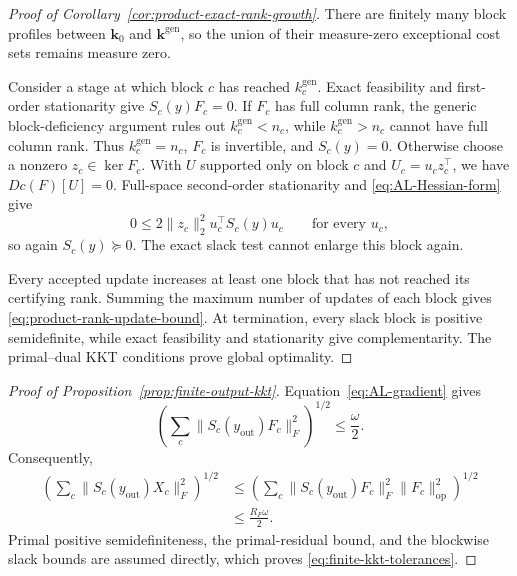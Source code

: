 \documentclass[11pt]{article}
\theoremstyle{definition}
\theoremstyle{remark}
\begin{document}
\begin{proof}[Proof of Corollary~\ref{cor:product-exact-rank-growth}]
There are finitely many block profiles between
$\mathbf k_0$ and $\mathbf k^{\mathrm{gen}}$, so the union of their
measure-zero exceptional cost sets remains measure zero.

Consider a stage at which block $c$ has reached
$k_c^{\mathrm{gen}}$.  Exact feasibility and first-order stationarity give
$S_c(y)F_c=0$.  If $F_c$ has full column rank, the generic block-deficiency
argument rules out $k_c^{\mathrm{gen}}<n_c$, while
$k_c^{\mathrm{gen}}>n_c$ cannot have full column rank.  Thus
$k_c^{\mathrm{gen}}=n_c$, $F_c$ is invertible, and $S_c(y)=0$.
Otherwise choose a nonzero $z_c\in\ker F_c$.  With $U$ supported only on
block $c$ and $U_c=u_cz_c^\top$, we have $Dc(F)[U]=0$.  Full-space
second-order stationarity and \eqref{eq:AL-Hessian-form} give
\[
  0\leq
  2\|z_c\|_2^2u_c^\top S_c(y)u_c
  \qquad\text{for every }u_c,
\]
so again $S_c(y)\succeq0$.  The exact slack test cannot enlarge this block
again.

Every accepted update increases at least one block that has not reached its
certifying rank.  Summing the maximum number of updates of each block gives
\eqref{eq:product-rank-update-bound}.  At termination, every slack block is
positive semidefinite, while exact feasibility and stationarity give
complementarity.  The primal--dual KKT conditions prove global optimality.
\end{proof}

\begin{proof}[Proof of Proposition~\ref{prop:finite-output-kkt}]
Equation~\eqref{eq:AL-gradient} gives
\[
  \left(\sum_c
    \|S_c(y_{\mathrm{out}})F_c\|_F^2
  \right)^{1/2}
  \leq\frac{\omega}{2}.
\]
Consequently,
\begin{align*}
  \left(\sum_c
    \|S_c(y_{\mathrm{out}})X_c\|_F^2
  \right)^{1/2}
  &\leq
  \left(\sum_c
    \|S_c(y_{\mathrm{out}})F_c\|_F^2\|F_c\|_{\mathrm{op}}^2
  \right)^{1/2}\\
  &\leq\frac{R_F\omega}{2}.
\end{align*}
Primal positive semidefiniteness, the primal-residual bound, and the blockwise
slack bounds are assumed directly, which proves
\eqref{eq:finite-kkt-tolerances}.
\end{proof}
\end{document}
